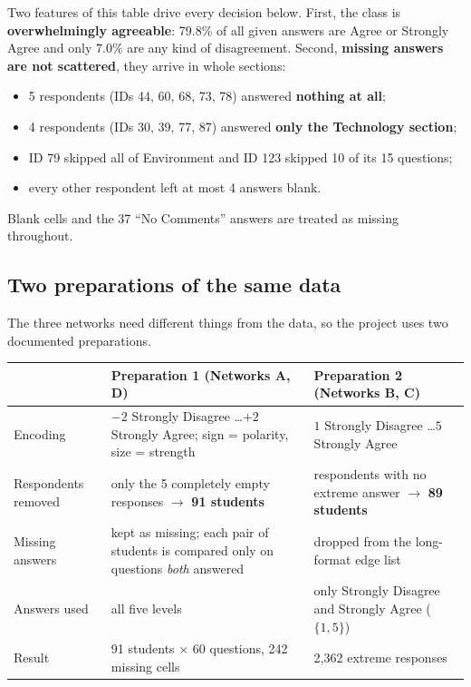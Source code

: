 \documentclass[11pt, a4paper]{article}
\begin{document}
Two features of this table drive every decision below. First, the class is
\textbf{overwhelmingly agreeable}: 79.8\% of all given answers are Agree or Strongly Agree and only 7.0\% are any
kind of disagreement. Second, \textbf{missing answers are not scattered}, they arrive in whole sections:

\begin{itemize}[nosep]
  \item 5 respondents (IDs 44, 60, 68, 73, 78) answered \textbf{nothing at all};
  \item 4 respondents (IDs 30, 39, 77, 87) answered \textbf{only the Technology section};
  \item ID 79 skipped all of Environment and ID 123 skipped 10 of its 15 questions;
  \item every other respondent left at most 4 answers blank.
\end{itemize}

Blank cells and the 37 ``No Comments'' answers are treated as missing throughout.

\subsection{Two preparations of the same data}

The three networks need different things from the data, so the project uses two documented preparations.

\begin{center}
\small
\begin{tabular}{p{3.9cm} p{5.2cm} p{5.2cm}}
\toprule
 & \textbf{Preparation 1 (Networks A, D)} & \textbf{Preparation 2 (Networks B, C)} \\
\midrule
Encoding & $-2$ Strongly Disagree \dots $+2$ Strongly Agree; sign = polarity, size = strength
        & $1$ Strongly Disagree \dots $5$ Strongly Agree \\
Respondents removed & only the 5 completely empty responses $\rightarrow$ \textbf{91 students}
        & respondents with no extreme answer $\rightarrow$ \textbf{89 students} \\
Missing answers & kept as missing; each pair of students is compared only on questions \emph{both} answered
        & dropped from the long-format edge list \\
Answers used & all five levels & only Strongly Disagree and Strongly Agree ($\{1,5\}$) \\
Result & 91 students $\times$ 60 questions, 242 missing cells & 2{,}362 extreme responses \\
\bottomrule
\end{tabular}
\end{center}
\end{document}
